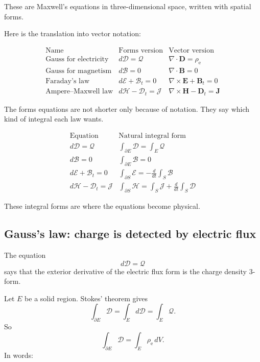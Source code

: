 These are Maxwell's equations in three-dimensional space, written with spatial forms.

Here is the translation into vector notation:

\[
\begin{array}{c|c|c}
\text{Name} & \text{Forms version} & \text{Vector version} \\ \hline
\text{Gauss for electricity}
& d\mathcal D=\mathcal Q
& \nabla\cdot\mathbf D=\rho_{\mathrm e}
\\[2mm]
\text{Gauss for magnetism}
& d\mathcal B=0
& \nabla\cdot\mathbf B=0
\\[2mm]
\text{Faraday's law}
& d\mathcal E+\mathcal B_t=0
& \nabla\times\mathbf E+\mathbf B_t=0
\\[2mm]
\text{Ampere--Maxwell law}
& d\mathcal H-\mathcal D_t=\mathcal J
& \nabla\times\mathbf H-\mathbf D_t=\mathbf J
\end{array}
\]

The forms equations are not shorter only because of notation.  They say which kind of
integral each law wants.

\[
\begin{array}{c|c}
\text{Equation} & \text{Natural integral form} \\ \hline
d\mathcal D=\mathcal Q
& \displaystyle \int_{\partial E}\mathcal D=\int_E\mathcal Q
\\[3mm]
d\mathcal B=0
& \displaystyle \int_{\partial E}\mathcal B=0
\\[3mm]
d\mathcal E+\mathcal B_t=0
& \displaystyle \int_{\partial S}\mathcal E
=
-\frac{d}{dt}\int_S\mathcal B
\\[3mm]
d\mathcal H-\mathcal D_t=\mathcal J
& \displaystyle \int_{\partial S}\mathcal H
=
\int_S\mathcal J+\frac{d}{dt}\int_S\mathcal D
\end{array}
\]

These integral forms are where the equations become physical.

\subsection{Gauss's law: charge is detected by electric flux}

The equation
\[
    d\mathcal D=\mathcal Q
\]
says that the exterior derivative of the electric flux form is the charge density
\(3\)-form.

Let \(E\) be a solid region.  Stokes' theorem gives
\[
    \int_{\partial E}\mathcal D
    =
    \int_E d\mathcal D
    =
    \int_E\mathcal Q.
\]
So
\[
\boxed{
    \int_{\partial E}\mathcal D
    =
    \int_E \rho_{\mathrm e}\,dV.
}
\]
In words:

